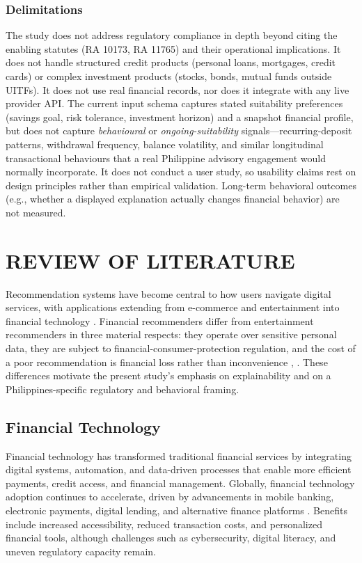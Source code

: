 \documentclass{icsthesis}
\begin{document}
\begin{mainmatter}
                \subsubsection{Delimitations}
                    The study does not address regulatory compliance in depth beyond citing the enabling statutes (RA 10173, RA 11765) and their operational implications. It does not handle structured credit products (personal loans, mortgages, credit cards) or complex investment products (stocks, bonds, mutual funds outside UITFs). It does not use real financial records, nor does it integrate with any live provider API. The current input schema captures stated suitability preferences (savings goal, risk tolerance, investment horizon) and a snapshot financial profile, but does not capture \emph{behavioural} or \emph{ongoing-suitability} signals---recurring-deposit patterns, withdrawal frequency, balance volatility, and similar longitudinal transactional behaviours that a real Philippine advisory engagement would normally incorporate. It does not conduct a user study, so usability claims rest on design principles rather than empirical validation. Long-term behavioral outcomes (e.g., whether a displayed explanation actually changes financial behavior) are not measured.
		
		\section{REVIEW OF LITERATURE}
		Recommendation systems have become central to how users navigate digital services, with applications extending from e-commerce and entertainment into financial technology \cite{ref13}. Financial recommenders differ from entertainment recommenders in three material respects: they operate over sensitive personal data, they are subject to financial-consumer-protection regulation, and the cost of a poor recommendation is financial loss rather than inconvenience \cite{ref13}, \cite{ref14}. These differences motivate the present study's emphasis on explainability and on a Philippines-specific regulatory and behavioral framing.

			\subsection{Financial Technology}
				Financial technology has transformed traditional financial services by integrating digital systems, automation, and data-driven processes that enable more efficient payments, credit access, and financial management. Globally, financial technology adoption continues to accelerate, driven by advancements in mobile banking, electronic payments, digital lending, and alternative finance platforms \cite{ref9}. Benefits include increased accessibility, reduced transaction costs, and personalized financial tools, although challenges such as cybersecurity, digital literacy, and uneven regulatory capacity remain.


\end{mainmatter}
\end{document}
